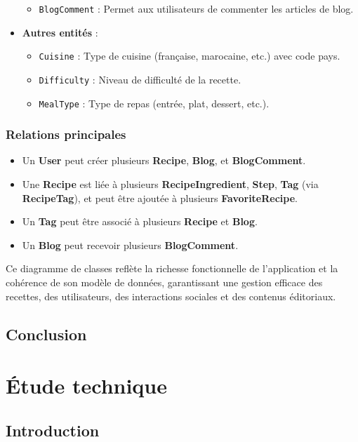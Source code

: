 \documentclass[12pt,a4paper]{report}
\begin{document}
\begin{itemize}
\begin{itemize}
        \item \texttt{BlogComment} : Permet aux utilisateurs de commenter les articles de blog.
    \end{itemize}
    \item \textbf{Autres entités} :
    \begin{itemize}
        \item \texttt{Cuisine} : Type de cuisine (française, marocaine, etc.) avec code pays.
        \item \texttt{Difficulty} : Niveau de difficulté de la recette.
        \item \texttt{MealType} : Type de repas (entrée, plat, dessert, etc.).
    \end{itemize}
\end{itemize}

\subsection*{Relations principales}
\begin{itemize}
    \item Un \textbf{User} peut créer plusieurs \textbf{Recipe}, \textbf{Blog}, et \textbf{BlogComment}.
    \item Une \textbf{Recipe} est liée à plusieurs \textbf{RecipeIngredient}, \textbf{Step}, \textbf{Tag} (via \textbf{RecipeTag}), et peut être ajoutée à plusieurs \textbf{FavoriteRecipe}.
    \item Un \textbf{Tag} peut être associé à plusieurs \textbf{Recipe} et \textbf{Blog}.
    \item Un \textbf{Blog} peut recevoir plusieurs \textbf{BlogComment}.
\end{itemize}

Ce diagramme de classes reflète la richesse fonctionnelle de l’application et la cohérence de son modèle de données, garantissant une gestion efficace des recettes, des utilisateurs, des interactions sociales et des contenus éditoriaux.
\section*{Conclusion}

\chapter{Étude technique}
\section*{Introduction}
\end{document}
